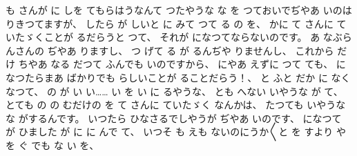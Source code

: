 も
さんが
に
しを
てもらはうなんて
つたやうな
な
を
つておいでぢやあ
いのは
りきつてますが、
%
したら
が
しいと
に
みて
つて
る
の
を、
%
かに
て
さんに
ていたゞくことが
るだらうと
つて、
%
それが
になつてならないのです。
%
あ
なぶらんさんの
ぢやあ
りますし、
%
つ
げて
る
が
るんぢや
りませんし、
%
これから
だけ
ちやあ
なる
だつて
ふんでも
いのですから、
%
にやあ
えずに
つて
ても、
%
になつたらまあ
ばかりでも
らしいことが
ることだらう！、
%
と
ふと
だか
に
なくなつて、
%
の
が
い
い……
い
を
い
に
るやうな、
%
とも
へない
いやうな
が
て、
%
とても
の
の
むだけの
を
て
さんに
ていたゞく
なんかは、
%
たつても
いやうな
な
がするんです。
%
いつたら
ひなさるでしやうが
ぢやあ
いのです、
%
になつて
が
ひました
が
に
に
んで
て、
%
いつそ
も
えも
ないのにうか〳〵と
を
すより
や
を
ぐ
でも
な
い
を、
